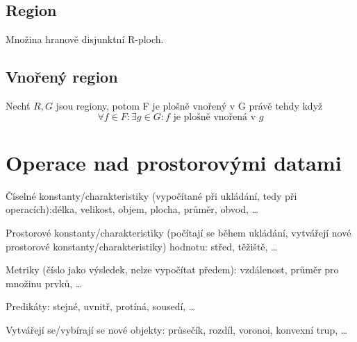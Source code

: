 \subsection{Region}

\begin{compactitem}
    \item Množina hranově disjunktní R-ploch.
\end{compactitem}

\subsection{Vnořený region}

\begin{compactitem}
    \item Nechť $R, G$ jsou regiony, potom F je plošně vnořený v G právě tehdy když
    $$ \forall f \in F : \exists g \in G : f \text{ je plošně vnořená v } g $$
\end{compactitem}


\section{Operace nad prostorovými datami}

\begin{compactitem}
    \item Číselné konstanty/charakteristiky (vypočítané při ukládání, tedy při operacích):\break délka, velikost, objem, plocha, průměr, obvod, \ldots

    \item Prostorové konstanty/charakteristiky (počítají se během ukládání, vytvářejí nové prostorové konstanty/charakteristiky)
    hodnotu: střed, těžiště, \ldots

    \item Metriky (číslo jako výsledek, nelze vypočítat předem): vzdálenost, průměr pro množinu prvků, \ldots

    \item Predikáty: stejné, uvnitř, protíná, sousedí, \ldots

    \item Vytvářejí se/vybírají se nové objekty: průsečík, rozdíl, voronoi, konvexní trup, \ldots
\end{compactitem}


